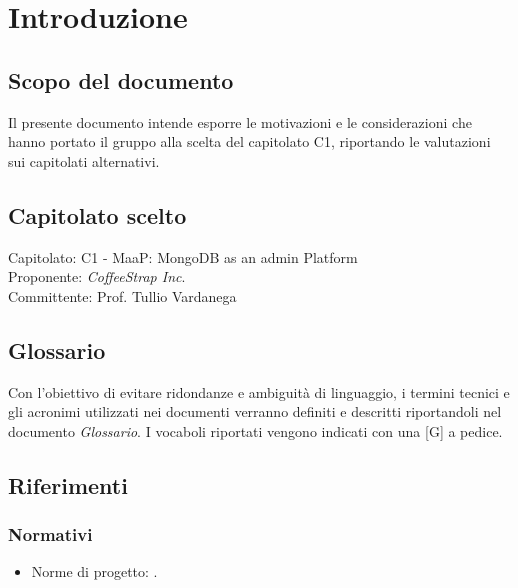 \section{Introduzione}

\subsection{Scopo del documento}
Il presente documento intende esporre le motivazioni e le considerazioni che hanno portato il gruppo alla scelta del capitolato C1, riportando le valutazioni sui capitolati alternativi.

\subsection{Capitolato scelto}
Capitolato: C1 - MaaP: MongoDB as an admin Platform\\
Proponente: \textit{CoffeeStrap Inc}. \\
Committente: Prof. Tullio Vardanega\\

\subsection{Glossario}
Con l'obiettivo di evitare ridondanze e ambiguità di linguaggio, i termini tecnici e gli acronimi utilizzati nei documenti verranno definiti e descritti riportandoli nel documento \emph{Glossario}. I vocaboli riportati vengono indicati con una [G] a pedice.

\subsection{Riferimenti}

	\subsubsection{Normativi}
	\begin{itemize}
		\item Norme di progetto: \NormeDiProgetto .
	\end{itemize}

